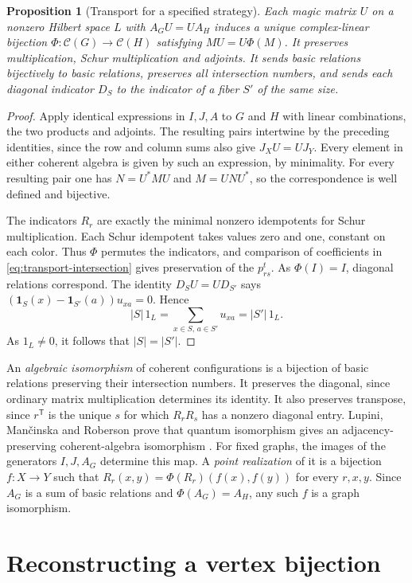 \documentclass[11pt,reqno]{amsart}
\numberwithin{equation}{section}
\newtheorem{proposition}[theorem]{Proposition}
\theoremstyle{definition}
\begin{document}
\begin{proposition}[Transport for a specified strategy]\label{prop:transport-fibers}
Each magic matrix $U$ on a nonzero Hilbert space $L$ with $A_GU=UA_H$
induces a unique complex-linear
bijection $\Phi:\mathcal C(G)\to\mathcal C(H)$ satisfying
$MU=U\Phi(M)$. It preserves multiplication, Schur multiplication and adjoints.
It sends basic relations bijectively to basic relations, preserves all
intersection numbers, and sends each diagonal indicator $D_S$ to the
indicator of a fiber $S'$ of the same size.
\end{proposition}
\begin{proof}
Apply identical expressions in $I,J,A$ to $G$ and $H$ with linear
combinations, the two products and adjoints. The resulting pairs intertwine
by the preceding identities, since the row and column sums also give $J_XU=UJ_Y$.
Every element in either coherent algebra is given by such an expression,
by minimality. For every resulting pair one has $N=U^*MU$ and
$M=UNU^*$, so the correspondence is well defined and bijective.

The indicators $R_r$ are exactly the minimal nonzero idempotents for Schur
multiplication. Each Schur idempotent takes values zero and one, constant on
each color. Thus $\Phi$ permutes the indicators, and comparison of coefficients
in \eqref{eq:transport-intersection} gives preservation of the $p_{rs}^t$.
As $\Phi(I)=I$, diagonal relations correspond. The identity $D_SU=UD_{S'}$
says $(\mathbf{1}_S(x)-\mathbf{1}_{S'}(a))u_{xa}=0$. Hence
\[
 |S|\,1_L=\sum_{x\in S,\,a\in S'}u_{xa}=|S'|\,1_L.
\]
As $1_L\ne0$, it follows that $|S|=|S'|$.
\end{proof}
An \emph{algebraic isomorphism} of coherent configurations is a bijection of basic relations preserving their intersection numbers. It preserves the diagonal, since ordinary matrix multiplication determines its identity. It also preserves transpose, since $r^{\mathsf T}$ is the unique $s$ for which $R_r R_s$ has a nonzero diagonal entry. Lupini, Man\v{c}inska and Roberson prove that quantum isomorphism gives an adjacency-preserving coherent-algebra isomorphism \cite[Cor.~4.7]{LMR}. For fixed graphs, the images of the generators $I,J,A_G$ determine this map. A \emph{point realization} of it is a bijection $f:X\to Y$ such that $R_r(x,y)=\Phi(R_r)(f(x),f(y))$ for every $r,x,y$. Since $A_G$ is a sum of basic relations and $\Phi(A_G)=A_H$, any such $f$ is a graph isomorphism.

\section{Reconstructing a vertex bijection}\label{sec:rectangles}
\end{document}
